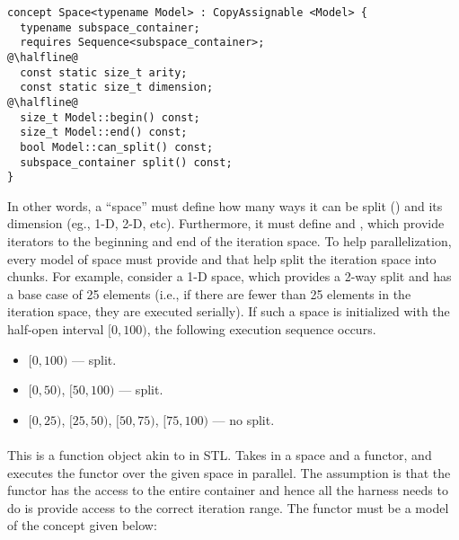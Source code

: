 \begin{center}
\begin{minipage}{0.7\textwidth}
\begin{lstlisting}
concept Space<typename Model> : CopyAssignable <Model> {
  typename subspace_container;
  requires Sequence<subspace_container>;
@\halfline@ 
  const static size_t arity;
  const static size_t dimension;
@\halfline@ 
  size_t Model::begin() const;
  size_t Model::end() const;
  bool Model::can_split() const;
  subspace_container split() const;
}
\end{lstlisting}
\end{minipage}
\end{center}

In other words, a ``space'' must define how many ways it can be split
() and its dimension (eg., 1-D, 2-D, etc).
%
Furthermore, it must define  and , which provide 
iterators to the beginning and end of the iteration space.
%
To help parallelization, every model of space must provide 
and  that help split the iteration space into  chunks.
%
For example, consider a 1-D space, which provides a 2-way split and has a 
base case of 25 elements (i.e., if there are fewer than 25 elements in the 
iteration space, they are executed serially).
%
If such a space is initialized with the half-open interval $[0, 100)$, the 
following execution sequence occurs.

\begin{center}
\begin{minipage}{0.6\textwidth}
\begin{itemize}
\item[] $[0,100)$ --- split.
\item[] $[0,50)$, $[50,100)$ --- split.
\item[] $[0,25)$, $[25,50)$, $[50,75)$, $[75,100)$ --- no split.
\end{itemize}
\end{minipage}
\end{center}

\paragraph{} This is a function object akin to 
 in STL.
%
 Takes in a space and a functor, and executes the 
functor over the given space in parallel.
%
The assumption is that the functor has the access to the entire container
and hence all the harness needs to do is provide access to the correct 
iteration range.
%
The functor must be a model of the  concept given below:

